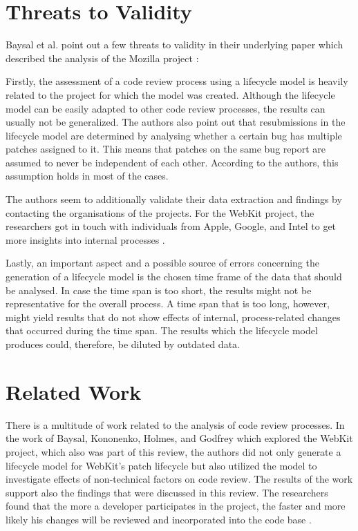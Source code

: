 \documentclass[conference]{IEEEtran}
\begin{document}
\section{Threats to Validity}

Baysal et al. point out a few threats to validity in their underlying paper which described the analysis of the Mozilla project \cite{baysal2012secret}:

Firstly, the assessment of a code review process using a lifecycle model is heavily related to the project for which the model was created. Although the lifecycle model can be easily adapted to other code review processes, the results can usually not be generalized. The authors also point out that resubmissions in the lifecycle model are determined by analysing whether a certain bug has multiple patches assigned to it. This means that patches on the same bug report are assumed to never be independent of each other. According to the authors, this assumption holds in most of the cases.

The authors seem to additionally validate their data extraction and findings by contacting the organisations of the projects. For the WebKit project, the researchers got in touch with individuals from Apple, Google, and Intel to get more insights into internal processes \cite{baysal2013influence}.

Lastly, an important aspect and a possible source of errors concerning the generation of a lifecycle model is the chosen time frame of the data that should be analysed. In case the time span is too short, the results might not be representative for the overall process. A time span that is too long, however, might yield results that do not show effects of internal, process-related changes that occurred during the time span. The results which the lifecycle model produces could, therefore, be diluted by outdated data. 

\section{Related Work}

There is a multitude of work related to the analysis of code review processes. In the work of Baysal, Kononenko, Holmes, and Godfrey which explored the WebKit project, which also was part of this review, the authors did not only generate a lifecycle model for WebKit's patch lifecycle but also utilized the model to investigate effects of non-technical factors on code review. The results of the work support also the findings that were discussed in this review. The researchers found that the more a developer participates in the project, the faster and more likely his changes will be reviewed and incorporated into the code base \cite{baysal2013influence}.
\end{document}
